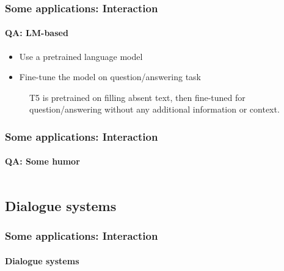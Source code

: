\documentclass[xcolor=table]{beamer}
\begin{document}
\begin{frame}
	\frametitle{Some applications: Interaction}
	\framesubtitle{QA: LM-based}
	
	\begin{itemize}
		\item Use a pretrained language model
		\item Fine-tune the model on question/answering task
	\end{itemize}

	\begin{figure}
		\centering
		\caption{T5 is pretrained on filling absent text, then fine-tuned for question/answering without any additional information or context. \cite{2020-roberts-al}}
	\end{figure}
	
\end{frame}

\begin{frame}
	\frametitle{Some applications: Interaction}
	\framesubtitle{QA: Some humor}
	
	\begin{columns}
		\begin{column}{0.3\textwidth}
			
		\end{column}
		\begin{column}{0.4\textwidth}
		\end{column}
	\end{columns}

\end{frame}

\subsection{Dialogue systems}

\begin{frame}
	\frametitle{Some applications: Interaction}
	\framesubtitle{Dialogue systems}
\end{frame}
\end{document}
